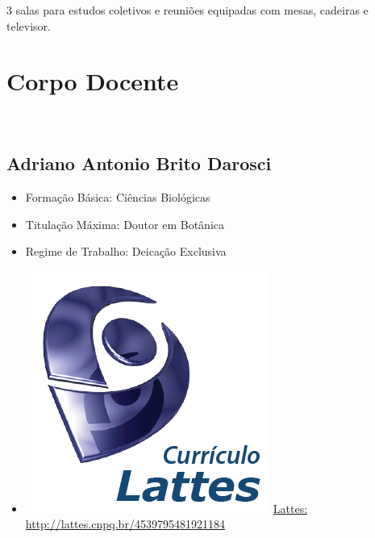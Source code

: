 \documentclass[11pt,fleqn]{book} %
\begin{document}
3 salas para estudos coletivos e reuniões equipadas com mesas, cadeiras e televisor.


\chapter{Corpo Docente}
\vspace{6em}
\begin{flushright}
	\textit{\textcolor{white}{Foto: Adriano Darosci}}
\end{flushright}
\vspace{12em}

\section{Adriano Antonio Brito Darosci}\label{AdrianoDarosci}
\begin{itemize}
	\item Formação Básica: Ciências Biológicas
	\item Titulação Máxima: Doutor em Botânica
	\item Regime de Trabalho: Deicação Exclusiva
	\item \includegraphics[scale=.03]{Pictures/lattes}~\href{http://lattes.cnpq.br/4539795481921184}{Lattes: http://lattes.cnpq.br/4539795481921184}
\end{itemize}
\end{document}
